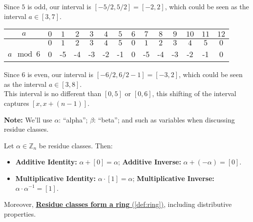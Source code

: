 \noindent
Since $5$ is odd, our interval is $[-5/2,5/2]=[-2,2]$, which could be seen as the interval $a\in[3,7]$.

\noindent

\begin{table}[h!]
    \setlength{\tabcolsep}{10pt} %
    \renewcommand{\arraystretch}{1.2} %
    \centering
\begin{tabular}{|*{14}{c|}}
    \hline
    \cellcolor{white}$a$ & $0$ & $1$ & $2$ &\cellcolor{OliveGreen!40} $3$ &\cellcolor{OliveGreen!40} $4$ &\cellcolor{OliveGreen!40} $5$ &\cellcolor{OliveGreen!40} $6$ &\cellcolor{OliveGreen!40} $7$ &\cellcolor{OliveGreen!40} $8$ & $9$ & $10$ & $11$ & $12$ \\
    \hline
       & $0$ & $1$ & $2$ & $3$ & $4$ & $5$ &\cellcolor{OliveGreen!20} $0$ &\cellcolor{OliveGreen!20} $1$ &\cellcolor{OliveGreen!20} $2$ & $3$ & $4$ & $5$ & $0$ \\
    \cline{2-14}
    \multirow{-2}{*}{$a\mod 6$}&0&-5&-4&\cellcolor{OliveGreen!20}-3&\cellcolor{OliveGreen!20}-2&\cellcolor{OliveGreen!20}-1&\cellcolor{OliveGreen!20}0&-5&-4&-3&-2&-1&0\\
    \hline
\end{tabular}
\end{table}

\noindent
Since $6$ is even, our interval is $[-6/2,6/2-1]=[-3,2]$, which could be seen as the interval $a\in[3,8]$.\\
This interval is no different than $[0,5]$ or $[0,6]$, this shifting of the interval captures $[x,x+(n-1)]$.

\begin{Note}
    \textbf{Note:} We'll use $\alpha$: ``alpha''; $\beta$: ``beta''; and such as variables when discussing residue classes.
\end{Note}
\begin{theo}
    
    \label{theo:res_class_ops}

    Let $\alpha\in\mathbb{Z}_n$ be residue classes. Then: 
    \begin{itemize}
        \item \textbf{Additive Identity:} $\alpha + [0] = \alpha$; \textbf{Additive Inverse:} $\alpha + (-\alpha) = [0]$.
        \item \textbf{Multiplicative Identity:} $\alpha\cdot [1] = \alpha$; \textbf{Multiplicative Inverse:} $\alpha\cdot \alpha^{-1} = [1]$.
    \end{itemize}
    \noindent
    Moreover, \underline{\textbf{Residue classes form a ring} (\ref{def:ring}),} including distributive properties.
\end{theo}

